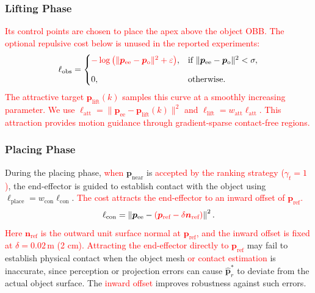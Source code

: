 \subsubsection{Lifting Phase}

 \textcolor{red}{Its control points are chosen to place the apex above the object OBB. The optional repulsive cost below is unused in the reported experiments:}
\begin{equation}
 \ell_{\text{obs}} =
\begin{cases}
\textcolor{red}{-\log\left ( {\|\boldsymbol{p}_{\text{ee}} - \boldsymbol{p}_{\text{o}}\|^2 + \varepsilon} \right )}, &
\text{if } \|\boldsymbol{p}_{\text{ee}} - \boldsymbol{p}_{\text{o}}\|^2 < \sigma, \\[8pt]
0, & \text{otherwise.}
\end{cases}
\end{equation}
\rev{}\textcolor{red}{The attractive target $\boldsymbol{p}_{\text{lift}}(k)$ samples this curve at a smoothly increasing parameter. We use $\ell_{\text{att}}=\|\boldsymbol{p}_{\text{ee}}-\boldsymbol{p}_{\text{lift}}(k)\|^2$ and $\ell_{\text{lift}}=w_{\text{att}}\ell_{\text{att}}$.}
\textcolor{red}{This attraction provides motion guidance through gradient-sparse contact-free regions.}

\subsubsection{Placing Phase}

During the placing phase, \textcolor{red}{when} $\boldsymbol{p}_{\text{near}}$ is \textcolor{red}{accepted by the ranking strategy} \textcolor{red}{($\gamma_t=1$)}, the end-effector is guided to establish contact with the object using $\ell_{\text{place}}=w_{\text{con}}\ell_{\text{con}}$.
\textcolor{red}{The cost attracts the end-effector to an inward offset of $\boldsymbol{p}_{\text{ref}}$.}
\begin{equation}
 \ell_{\text{con}} = \left\|\boldsymbol{p}_{\text{ee}} - \textcolor{red}{(\boldsymbol{p}_{\text{ref}} - \delta\boldsymbol{n}_{\text{ref}})}\right\|^2. \label{eq:placing_cost}
\end{equation}
\textcolor{red}{Here $\boldsymbol{n}_{\text{ref}}$ is the outward unit surface normal at $\boldsymbol{p}_{\text{ref}}$, and the inward offset is fixed at $\delta=0.02\,\mathrm{m}$ (2 cm).} \textcolor{red}{Attracting the end-effector directly to $\boldsymbol{p}_{\text{ref}}$} may fail to establish physical contact when the object mesh \textcolor{red}{or contact estimation} is inaccurate, since perception or projection errors can cause $\hat{\boldsymbol{p}}_r^*$ to deviate from the actual object surface. The \textcolor{red}{inward offset} improves robustness against such errors.

